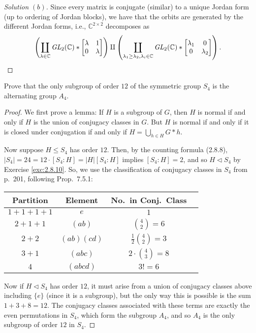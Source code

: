 \documentclass[12pt]{article}
\theoremstyle{remark}
\newcommand{\GL}{\mathit{GL}}
\begin{document}
\begin{proof}[Solution $(b)$]
  Since every matrix is conjugate (similar) to a unique Jordan form (up to ordering of Jordan blocks), we have that the orbits are generated by the different Jordan forms, i.e., $\mathbb{C}^{2 \times 2}$ decomposes as
  \begin{equation*}
    \left( \coprod_{\lambda \in \mathbb{C}} \GL_2(\mathbb{C}) \ast \begin{bmatrix}
      \lambda & 1\\
      0 & \lambda
    \end{bmatrix} \right) \amalg \left( \coprod_{\lambda_1 \ge \lambda_2, \lambda_i \in \mathbb{C}} \GL_2(\mathbb{C}) \ast \begin{bmatrix}
      \lambda_1 & 0\\
      0 & \lambda_2
    \end{bmatrix} \right).\qedhere
  \end{equation*}
\end{proof}

\setcounter{subsubsection}{10}
\begin{problem}\label{exc:6.7.11}
  Prove that the only subgroup of order $12$ of the symmetric group $S_4$ is the alternating group $A_4$.
\end{problem}
\begin{proof}
  We first prove a lemma: If $H$ is a subgroup of $G$, then $H$ is normal if and only if $H$ is the union of conjugacy classes in $G$. But $H$ is normal if and only if it is closed under conjugation if and only if $H = \bigcup_{h \in H} G \ast h$.
  \par Now suppose $H \leqslant S_4$ has order $12$. Then, by the counting formula (2.8.8), $\lvert S_4 \rvert = 24 = 12 \cdot [S_4:H] = \lvert H \rvert [S_4:H]$ implies $[S_4:H] = 2$, and so $H \lhd S_4$ by Exercise \ref{exc:2.8.10}. So, we use the classification of conjugacy classes in $S_4$ from p.~201, following Prop.~7.5.1:
  \begin{center}
    \begin{tabular}{cccc}
      Partition & Element & No.~in Conj.~Class\\
      \hline
      $1 + 1 + 1 + 1$ & $e$ & $1$\\
      $2 + 1 + 1$ & $(ab)$ & $\binom{4}{2} = 6$\\
      $2 + 2$ & $(ab)(cd)$ & $\frac{1}{2}\binom{4}{2} = 3$\\
      $3 + 1$ & $(abc)$ & $2\cdot\binom{4}{3} = 8$\\
      $4$ & $(abcd)$ & $3! = 6$
    \end{tabular}
  \end{center}
  Now if $H \lhd S_4$ has order $12$, it must arise from a union of conjugacy classes above including $\{e\}$ (since it is a subgroup), but the only way this is possible is the sum $1+3+8 = 12$. The conjugacy classes associated with these terms are exactly the even permutations in $S_4$, which form the subgroup $A_4$, and so $A_4$ is the only subgroup of order $12$ in $S_4$.
\end{proof}
\end{document}
